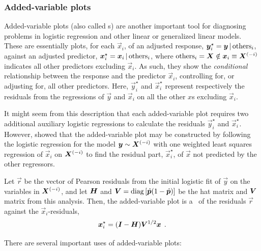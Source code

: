 \documentclass[11pt]{book}\usepackage[]{graphicx}\usepackage[]{color}
\begin{document}
\subsubsection{Added-variable plots}
Added-variable plots \citep{CookWeisberg:99,WangP:85}
(also called s)
are another important tool for diagnosing problems in logistic
regression and other linear or generalized linear models.
These are essentially plots, for each $\vec{x}_i$, of an adjusted 
response, 
$\bm{y}_i^\star = \bm{y} \, | \, \mbox{others}_i$,
against an adjusted predictor, 
$\bm{x}_i^\star = \bm{x}_i \, | \, \mbox{others}_i$,
where $\mbox{others}_i = \bm{X} \notin \bm{x}_i \equiv \bm{X}^{(-i)}$ 
indicates all other predictors excluding $\vec{x}_i$.
As such, they show the \emph{conditional} relationship between the response
and the predictor $\vec{x}_i$, controlling for, or adjusting for, all other
predictors.
Here, $\vec{y}_i^\star$ and $\vec{x}_i^\star$  represent respectively
the residuals from
the regressions of $\vec{y}$ and $\vec{x}_i$ on all the other $x$s
excluding $\vec{x}_i$.

It might seem from this description that each added-variable plot requires
two additional auxiliary logistic regressions to calculate the residuals
$\vec{y}_i^\star$ and $\vec{x}_i^\star$. 
However, \citet{WangP:85}
showed that the added-variable plot may be constructed by following the logistic
regression for the model $\bm{y} \sim \bm{X}^{(-i)}$
with one weighted least squares regression of $\vec{x}_i$ on
$\bm{X}^{(-i)}$ to find the residual part, $\vec{x}_i^{\star}$,  of $\vec{x}$ not predicted
by the other regressors.

Let $\vec{r}$ be the vector of Pearson residuals from the initial logistic
fit of $\vec{y}$ on the variables in $\bm{X}^{(-i)}$,
and let $\bm{H}$ and $\bm{V} = \mathrm{diag}\, [ \hat{\bm{p}} ( 1 - \hat{\bm{p}})]$
be the hat matrix and $\bm{V}$ matrix from this analysis.
Then, the added-variable plot is a \scat\ of
the residuals $\vec{r}$ against the $\vec{x}_i$-residuals,
\begin{equation*}%
 \vec{x}_i^{\star} = ( \mat{I} - \mat{H} ) \mat{V}^{1/2} \vec{x} \period
\end{equation*}


There are several important uses of added-variable plots:
\end{document}
